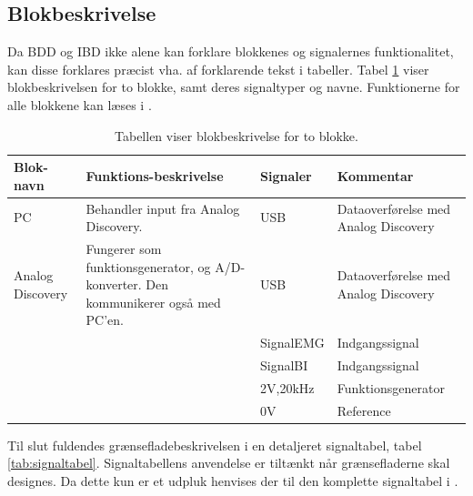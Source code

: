 \subsection{Blokbeskrivelse}

Da BDD og IBD ikke alene kan forklare blokkenes og signalernes funktionalitet, kan disse forklares præcist vha. af forklarende tekst i tabeller. Tabel \ref{tab:BlokBeskr} viser blokbeskrivelsen for to blokke, samt deres signaltyper og navne. Funktionerne for alle blokkene kan læses i  .


\begin{table}[H]
\centering
\begin{tabularx}{\textwidth}{l|X|X|X}
\hline
\textbf{Blok-navn}                        & \textbf{Funktions-beskrivelse}  & \textbf{Signaler} & \textbf{Kommentar} \\  \hline

PC & Behandler input fra Analog Discovery.  &  USB & Dataoverførelse med Analog Discovery   \\ \cline{3-4} \hline


Analog Discovery & Fungerer som funktionsgenerator, og  A/D-konverter. Den kommunikerer også med PC'en.  &  USB & Dataoverførelse med Analog Discovery   \\ \cline{3-4}

 	 
 	 &  & SignalEMG & Indgangssignal  \\ \cline{3-4}
 	 
 	 &  & SignalBI & Indgangssignal  \\ \cline{3-4}
 	 &  & $   ${2V,20kHz} & Funktionsgenerator  \\ \cline{3-4}
 	 &  & $   ${0V} & Reference  \\ \cline{3-4} \hline
 	 
\end{tabularx}
\caption{Tabellen viser blokbeskrivelse for to blokke.} 
\label{tab:BlokBeskr}
\end{table}

\pagebreak

Til slut fuldendes grænsefladebeskrivelsen i en detaljeret signaltabel, tabel \ref{tab:signaltabel}. Signaltabellens anvendelse er tiltænkt når grænsefladerne skal designes. Da dette kun er et udpluk henvises der til den komplette signaltabel i .



